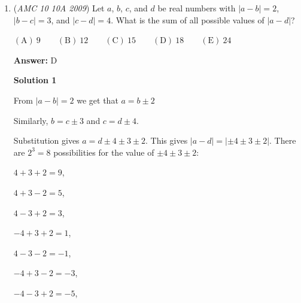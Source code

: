 \begin{enumerate}
\textbf{Solution 4}

The sequence $\{ d_n\}$ goes $1, 5, 13, 25, 41,\dots$. The first finite differences go $4, 8, 12, 16, \dots$. The second finite differences go $4, 4, 4, \dots$, so we see that the second finite difference is constant. Thus, $d_n$ can be represented as a quadratic, $d_n = an^2 + bn + c$. However, we already know $d_1 = 1$, $d_2 = 3$, and $d_3 = 13$. Thus,
 \[a + b + c = d_1 = 1\]
 \[4a + 2b + c = d_2 = 3\]
 \[9a + 3b + c = d_3 = 13\]Solving this system for $a$, $b$, and $c$ gives $a = 2$, $b = -2$, $c = 1$. Finally, $d_n = 2n^2 - 2n + 1\implies d_{20} = \boxed{(E)761}$




\textbf{Solution 5}

We can use Newton's little formula for this problem. We continue with solution 4 until we get the second finite differences go $4, 4, 4, \dots$, Then we find the 20th term by applying the formula to get  1 (20-1 c 0) + 4 (20 - 1 c 1) + 4(20-1 c 2) = 1 (19 c 0 ) + 4 (19 c 1) + 4(19 c 2) = 761

 \begin{verbatim}
- timi821
\end{verbatim}




	\item (\textit{AMC 10 10A 2009}) Let $a$, $b$, $c$, and $d$ be real numbers with $|a-b|=2$, $|b-c|=3$, and $|c-d|=4$. What is the sum of all possible values of $|a-d|$?


 $\mathrm{(A)}\ 9 \qquad \mathrm{(B)}\ 12 \qquad \mathrm{(C)}\ 15 \qquad \mathrm{(D)}\ 18 \qquad \mathrm{(E)}\ 24$

 \textbf{Answer: }D



\textbf{Solution 1}

From $|a-b|=2$ we get that $a=b\pm 2$

 Similarly, $b=c\pm3$ and $c=d\pm4$.

 Substitution gives $a=d\pm 4\pm 3\pm 2$. This gives $|a-d|=|\pm 4\pm 3\pm 2|$. There are $2^3=8$ possibilities for the value of $\pm 4\pm 3\pm2$:

 $4+3+2=9$, 

 $4+3-2=5$, 

 $4-3+2=3$, 

 $-4+3+2=1$, 

 $4-3-2=-1$, 

 $-4+3-2=-3$, 

 $-4-3+2=-5$, 


\end{enumerate}
